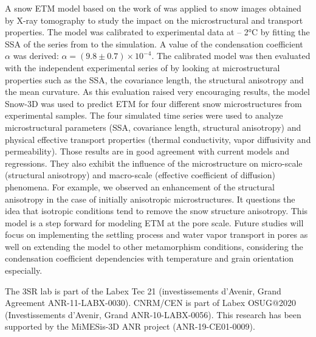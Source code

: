 \documentclass[draft,ms]{agujournal2019}
\begin{document}
A snow ETM model based on the work of  was applied to snow images obtained by X-ray tomography to study the impact on the microstructural and transport properties. The model was calibrated to experimental data at – 2°C by fitting the SSA of the series from  to the simulation. A value of the condensation coefficient $\alpha$ was derived: $\alpha = ( 9.8 \pm 0.7)\times 10^{-4}$. The calibrated model was then evaluated with the independent experimental series of  by looking at microstructural properties such as the SSA, the covariance length, the structural anisotropy and the mean curvature. As this evaluation raised very encouraging results, the model Snow-3D was used to predict ETM for four different snow microstructures from experimental samples. The four simulated time series were used to analyze microstructural parameters (SSA, covariance length, structural anisotropy) and physical effective transport properties (thermal conductivity, vapor diffusivity and permeability). Those results are in good agreement with current models and regressions. They also exhibit the influence of the microstructure on micro-scale (structural anisotropy) and macro-scale (effective coefficient of diffusion) phenomena. For example, we observed an enhancement of the structural anisotropy in the case of initially anisotropic microstructures. It questions the idea that isotropic conditions tend to remove the snow structure anisotropy. This model is a step forward for modeling ETM at the pore scale. Future studies will focus on implementing the settling process and water vapor transport in pores as well on extending the model to other metamorphism conditions, considering the condensation coefficient dependencies with temperature and grain orientation especially.

\acknowledgments
The 3SR lab is part of the Labex Tec 21 (investissements d'Avenir, Grand Agreement ANR-11-LABX-0030). CNRM/CEN is part of Labex OSUG@2020 (Investissements d'Avenir, Grand ANR-10-LABX-0056). This research has been supported by the MiMESis-3D ANR project (ANR-19-CE01-0009).


\end{document}

